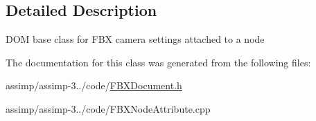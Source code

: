\subsection{Detailed Description}
D\+O\+M base class for F\+B\+X camera settings attached to a node 

The documentation for this class was generated from the following files\+:\begin{DoxyCompactItemize}
\item 
assimp/assimp-\/3../code/\hyperlink{_f_b_x_document_8h}{F\+B\+X\+Document.\+h}\item 
assimp/assimp-\/3../code/F\+B\+X\+Node\+Attribute.\+cpp\end{DoxyCompactItemize}

